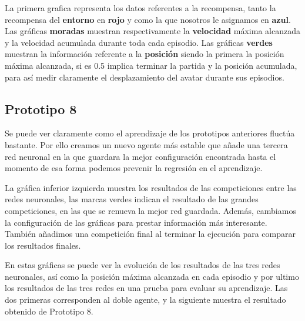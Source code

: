 La primera grafica representa los datos referentes a la recompensa, tanto la recompensa del \textbf{entorno} en \textbf{rojo} y como la que nosotros le asignamos en \textbf{azul}. 
Las gráficas \textbf{moradas} muestran respectivamente la \textbf{velocidad} máxima alcanzada y la velocidad acumulada durante toda cada episodio. 
Las gráficas \textbf{verdes} muestran la información referente a la \textbf{posición} siendo la primera la posición máxima alcanzada, si es 0.5 implica terminar la partida y la posición acumulada, para así medir claramente el desplazamiento del avatar durante sus episodios.

\subsection{Prototipo 8}
Se puede ver claramente como el aprendizaje de los prototipos anteriores fluctúa bastante. Por ello creamos un nuevo agente más estable que añade una tercera red neuronal en la que guardara la mejor configuración encontrada hasta el momento de esa forma podemos prevenir la regresión en el aprendizaje.

%

La gráfica inferior izquierda muestra los resultados de las competiciones entre las redes neuronales, las marcas verdes indican el resultado de las grandes competiciones, en las que se renueva la mejor red guardada.
Además, cambiamos la configuración de las gráficas para prestar información más interesante.
También añadimos una competición final al terminar la ejecución para comparar los resultados finales.

%

%


En estas gráficas se puede ver la evolución de los resultados de las tres redes neuronales, así como la posición máxima alcanzada en cada episodio y por ultimo los resultados de las tres redes en una prueba para evaluar su aprendizaje.  
Las dos primeras corresponden al doble agente, y la siguiente muestra el resultado obtenido de Prototipo 8. 



